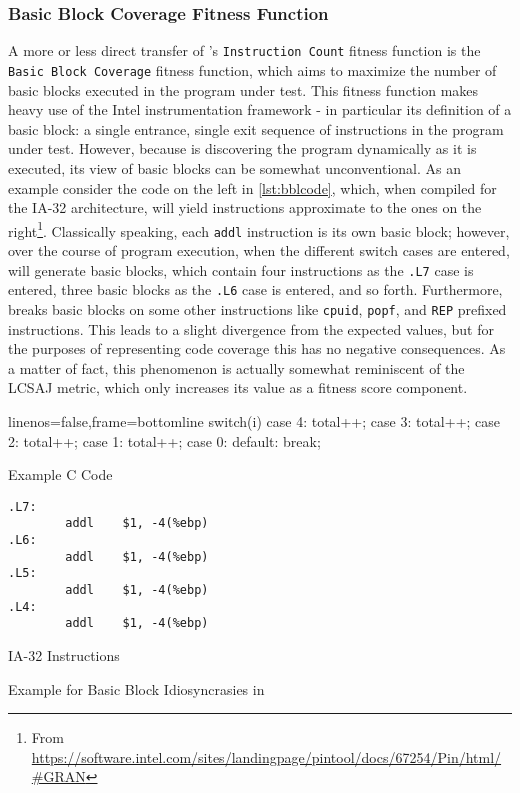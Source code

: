 \subsubsection{Basic Block Coverage Fitness Function}
A more or less direct transfer of \evosuite's \texttt{Instruction Count} fitness function is the 
\texttt{Basic Block Coverage} fitness function, which aims to maximize the number of basic blocks 
executed in the program under test. This fitness function makes heavy use of the {\small Intel} \pin
instrumentation framework - in particular its definition of a basic block: a single entrance, 
single exit sequence of instructions in the program under test. However, because \pin is discovering the 
program dynamically as it is executed, its view of basic blocks can be somewhat unconventional. As an 
example consider the code on the left in \cref{lst:bblcode}, which, when compiled for the IA-32 
architecture, will yield instructions approximate to the ones on the 
right\footnote{From \url{https://software.intel.com/sites/landingpage/pintool/docs/67254/Pin/html/\#GRAN}}.
Classically speaking, each \texttt{addl} instruction is its own basic block; however, over the course
of program execution, when the different switch cases are entered, \pin will generate basic blocks, which
contain four instructions as the \texttt{.L7} case is entered, three basic blocks as the \texttt{.L6}
case is entered, and so forth. Furthermore, \pin breaks basic blocks on some other instructions like 
\texttt{cpuid}, \texttt{popf}, and \texttt{REP} prefixed instructions. This leads to a slight divergence 
from the expected values, but for the purposes of representing code coverage this has no negative 
consequences. As a matter of fact, this phenomenon is actually somewhat reminiscent of the LCSAJ
metric\cite{Hennell:1976:PA}, which only increases its value as a fitness score component.
\begin{listing}[h]
\centering
\begin{minipage}[b]{0.49\textwidth}
	\centering
	\begin{ccode*}{linenos=false,frame=bottomline}
	switch(i) {
        case 4: total++;
        case 3: total++;
        case 2: total++;
        case 1: total++;
        case 0:
        default: break;
    	}
\end{ccode*}
	Example C Code
 \end{minipage}
%
 \begin{minipage}[b]{0.49\textwidth}
  \centering
  \begin{verbatim}
.L7:
        addl    $1, -4(%ebp)
.L6:
        addl    $1, -4(%ebp)
.L5:
        addl    $1, -4(%ebp)
.L4:
        addl    $1, -4(%ebp)
\end{verbatim}
  IA-32 Instructions
 \end{minipage}
 \caption{Example for Basic Block Idiosyncrasies in \pin}
 \label{lst:bblcode}
\end{listing}

